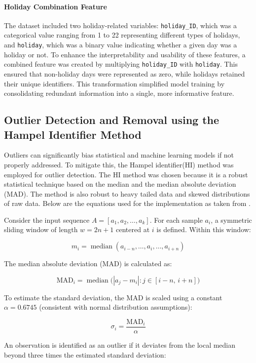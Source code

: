 \paragraph{Holiday Combination Feature}
The dataset included two holiday-related variables: \texttt{holiday\_ID}, which was a categorical value ranging from 1 to 22 representing different types of holidays, and \texttt{holiday}, which was a binary value indicating whether a given day was a holiday or not. To enhance the interpretability and usability of these features, a combined feature was created by multiplying \texttt{holiday\_ID} with \texttt{holiday}. This ensured that non-holiday days were represented as zero, while holidays retained their unique identifiers. This transformation simplified model training by consolidating redundant information into a single, more informative feature.

\subsection{Outlier Detection and Removal using the Hampel Identifier Method}
Outliers can significantly bias statistical and machine learning models if not properly addressed. To mitigate this, the Hampel identifier(HI) method was employed for outlier detection. The HI method was chosen because it is a robust statistical technique based on the median and the median absolute deviation (MAD)\cite{hiceemdanQteg}. The method is also robust to heavy tailed data and skewed distributions of raw data. Below are the equations used for the implementation as taken from \cite{hiceemdanQteg}.

Consider the input sequence \(A = [a_1, a_2, \ldots, a_k]\). For each sample \(a_i\), a symmetric sliding window of length \(w = 2n + 1\) centered at \(i\) is defined. Within this window:

\[
m_i = \operatorname{median}(a_{i-n}, \ldots, a_i, \ldots, a_{i+n})
\tag{1}
\]

The median absolute deviation (MAD) is calculated as:

\[
\mathrm{MAD}_i = \operatorname{median}\big(|a_{j} - m_i| : j \in [i-n,\, i+n]\big)
\tag{2}
\]

To estimate the standard deviation, the MAD is scaled using a constant \(\alpha = 0.6745\) (consistent with normal distribution assumptions):

\[
\sigma_i = \frac{\mathrm{MAD}_i}{\alpha}
\tag{3}
\]

An observation is identified as an outlier if it deviates from the local median beyond three times the estimated standard deviation:

